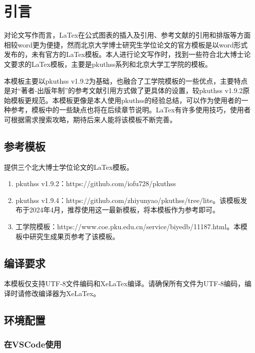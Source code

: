 \chapter{引言}
\label{chap:introduction}

对论文写作而言，LaTex在公式图表的插入及引用、参考文献的引用和排版等方面相较word更为便捷，然而北京大学博士研究生学位论文的官方模板是以word形式发布的，未有官方的LaTex模板。本人进行论文写作时，找到一些符合北大博士论文要求的LaTex模板，主要是pkuthss系列和北京大学工学院的模板。

本模板主要以pkuthss v1.9.2为基础，也融合了工学院模板的一些优点，主要特点是对“著者-出版年制”的参考文献引用方式做了更具体的设置，较pkuthss v1.9.2原始模板更规范。本模板更像是本人使用pkuthss的经验总结，可以作为使用者的一种参考，模板中的一些缺点也将在后续章节说明。LaTex有许多使用技巧，使用者可根据需求搜索攻略，期待后来人能将该模板不断完善。

\section{参考模板}

提供三个北大博士学位论文的LaTex模板。

\begin{enumerate}[itemindent=0.3em]     %
    \item pkuthss v1.9.2：https://github.com/iofu728/pkuthss
    \item pkuthss v1.9.4：https://github.com/zhiyunyao/pkuthss/tree/lite。该模板发布于2024年4月，推荐使用这一最新模板，将本模板作为参考即可。
    \item 工学院模板：https://www.coe.pku.edu.cn/service/biyedb/11187.html。本模板中研究生成果页参考了该模板。
\end{enumerate}

\section{编译要求}

本模板仅支持UTF-8文件编码和XeLaTex编译。请确保所有文件为UTF-8编码，编译时请修改编译器为XeLaTex。

\section{环境配置}

\subsection{在VSCode使用}

